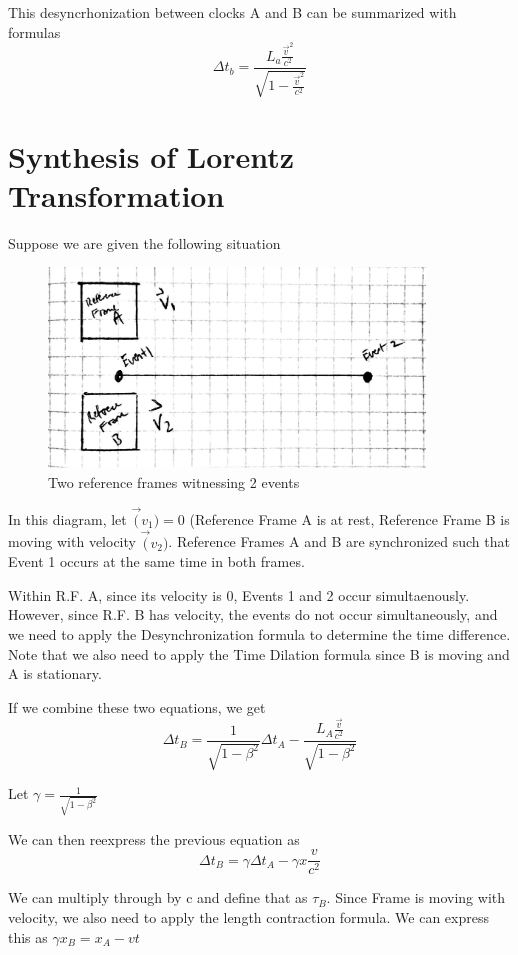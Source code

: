 \documentclass{article}
\begin{document}
This desyncrhonization between clocks A and B can be summarized with formulas
\[
  \Delta t_b = \frac{L_a \frac{\vec{v}^2}{c^2}}{\sqrt{1 - \frac{\vec{v}^2}{c^2}}}
\]
\newpage
\section{Synthesis of Lorentz Transformation}
Suppose we are given the following situation
\begin{figure}[!htb]
  \centering
  \includegraphics[width=100mm]{lorentztransformation1}\par
  \caption{Two reference frames witnessing 2 events}
\end{figure}

In this diagram, let \(\vec(v_1) = 0\) (Reference Frame A is at rest, Reference Frame B is moving with velocity \(\vec(v_2)\). Reference Frames A and B are synchronized such that Event 1 occurs at the same time in both frames.

Within R.F. A, since its velocity is 0, Events 1 and 2 occur simultaenously. However, since R.F. B has velocity, the events do not occur simultaneously, and we need to apply the Desynchronization formula to determine the time difference. Note that we also need to apply the Time Dilation formula since B is moving and A is stationary.

If we combine these two equations, we get
\[
  \Delta t_B = \frac{1}{\sqrt{1 - \beta^2}} \Delta t_A - \frac{L_A\frac{\vec{v}}{c^2}}{\sqrt{1 - \beta^2}}
\]

Let \(\gamma = \frac{1}{\sqrt{1 - \beta^2}}\)

We can then reexpress the previous equation as
\[
  \Delta t_B = \gamma \Delta t_A - \gamma x \frac{v}{c^2}
\]

We can multiply through by c and define that as \(\tau_B\). Since Frame is moving with velocity, we also need to apply the length contraction formula. We can express this as \(\gamma x_B = x_A - vt\)
\end{document}
